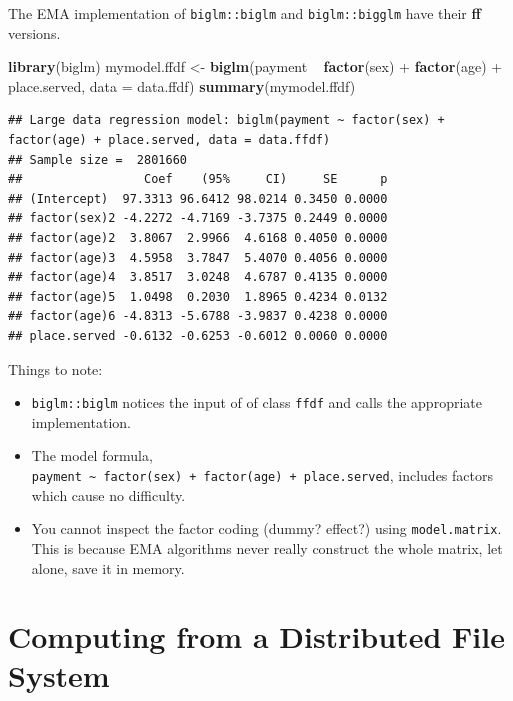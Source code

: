 \documentclass[]{book}
\newenvironment{Shaded}{\begin{snugshade}}{\end{snugshade}}
\newcommand{\KeywordTok}[1]{\textcolor[rgb]{0.13,0.29,0.53}{\textbf{{#1}}}}
\newcommand{\DataTypeTok}[1]{\textcolor[rgb]{0.13,0.29,0.53}{{#1}}}
\newcommand{\StringTok}[1]{\textcolor[rgb]{0.31,0.60,0.02}{{#1}}}
\newcommand{\NormalTok}[1]{{#1}}
\providecommand{\tightlist}{%
  \setlength{\itemsep}{0pt}\setlength{\parskip}{0pt}}
\theoremstyle{definition}
\theoremstyle{definition}
\theoremstyle{remark}
\begin{document}
The EMA implementation of \texttt{biglm::biglm} and
\texttt{biglm::bigglm} have their \textbf{ff} versions.

\begin{Shaded}
\begin{Highlighting}[]
\KeywordTok{library}\NormalTok{(biglm)}
\NormalTok{mymodel.ffdf <-}\StringTok{ }\KeywordTok{biglm}\NormalTok{(payment ~}\StringTok{ }\KeywordTok{factor}\NormalTok{(sex) +}\StringTok{ }\KeywordTok{factor}\NormalTok{(age) +}\StringTok{ }\NormalTok{place.served, }
                              \DataTypeTok{data =} \NormalTok{data.ffdf)}
\KeywordTok{summary}\NormalTok{(mymodel.ffdf)}
\end{Highlighting}
\end{Shaded}

\begin{verbatim}
## Large data regression model: biglm(payment ~ factor(sex) + factor(age) + place.served, data = data.ffdf)
## Sample size =  2801660 
##                 Coef    (95%     CI)     SE      p
## (Intercept)  97.3313 96.6412 98.0214 0.3450 0.0000
## factor(sex)2 -4.2272 -4.7169 -3.7375 0.2449 0.0000
## factor(age)2  3.8067  2.9966  4.6168 0.4050 0.0000
## factor(age)3  4.5958  3.7847  5.4070 0.4056 0.0000
## factor(age)4  3.8517  3.0248  4.6787 0.4135 0.0000
## factor(age)5  1.0498  0.2030  1.8965 0.4234 0.0132
## factor(age)6 -4.8313 -5.6788 -3.9837 0.4238 0.0000
## place.served -0.6132 -0.6253 -0.6012 0.0060 0.0000
\end{verbatim}

Things to note:

\begin{itemize}
\tightlist
\item
  \texttt{biglm::biglm} notices the input of of class \texttt{ffdf} and
  calls the appropriate implementation.
\item
  The model formula,
  \texttt{payment\ \textasciitilde{}\ factor(sex)\ +\ factor(age)\ +\ place.served},
  includes factors which cause no difficulty.
\item
  You cannot inspect the factor coding (dummy? effect?) using
  \texttt{model.matrix}. This is because EMA algorithms never really
  construct the whole matrix, let alone, save it in memory.
\end{itemize}

\section{Computing from a Distributed File
System}\label{computing-from-a-distributed-file-system}
\end{document}
